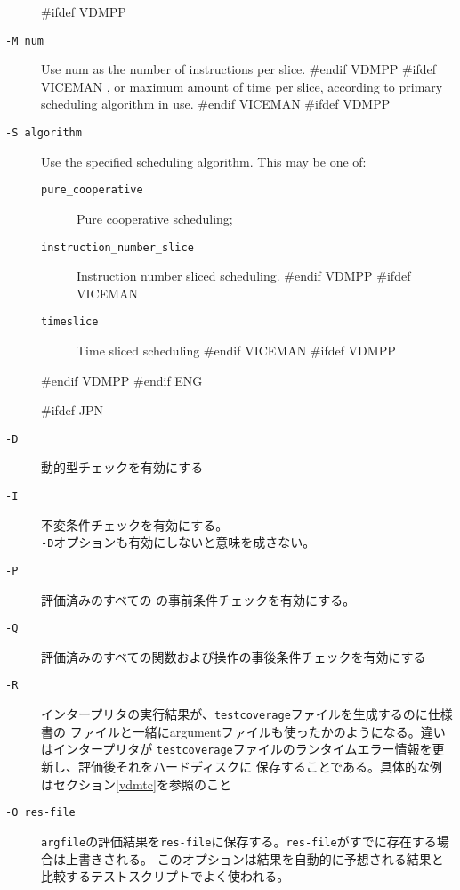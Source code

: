 \documentclass[\pformat,12pt]{article}
\begin{document}
\begin{description}
#ifdef VDMPP
\item[{\tt -M num}] Use num as the number of instructions per slice.
#endif VDMPP
#ifdef VICEMAN
, or maximum amount of time per slice, according to primary scheduling algorithm in use.
#endif VICEMAN
#ifdef VDMPP
\item[{\tt -S algorithm}] Use the specified scheduling algorithm. This
  may be one of:
  \begin{description}
  \item[{\tt pure\_cooperative}] Pure cooperative scheduling;
  \item[{\tt instruction\_number\_slice}] Instruction number sliced
    scheduling.
#endif VDMPP
#ifdef VICEMAN
  \item[{\tt timeslice}] Time sliced scheduling
#endif VICEMAN
#ifdef VDMPP
  \end{description}
#endif VDMPP
#endif ENG

#ifdef JPN
\item[{\tt -D}] 動的型チェックを有効にする
  
\item[{\tt -I}] 不変条件チェックを有効にする。 \\
  {\tt -D}オプションも有効にしないと意味を成さない。\\

\item[{\tt -P}]
評価済みのすべての
の事前条件チェックを有効にする。

\item[{\tt -Q}]
評価済みのすべての関数および操作の事後条件チェックを有効にする

\item[{\tt -R}]
  インタープリタの実行結果が、{\tt testcoverage}ファイルを生成するのに仕様書の
  ファイルと一緒にargumentファイルも使ったかのようになる。違いはインタープリタが
  {\tt testcoverage}ファイルのランタイムエラー情報を更新し、評価後それをハードディスクに
  保存することである。具体的な例はセクション\ref{vdmtc}を参照のこと
  
\item[{\tt -O res-file}]
  {\tt argfile}の評価結果を{\tt res-file}に保存する。{\tt res-file}がすでに存在する場合は上書きされる。
  このオプションは結果を自動的に予想される結果と比較するテストスクリプトでよく使われる。
  

\end{description}
\end{document}
